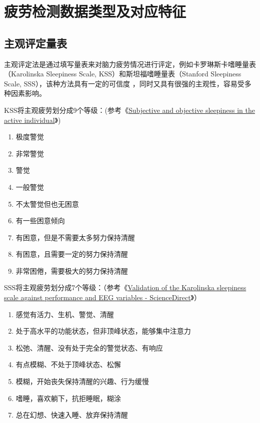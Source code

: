 \section{疲劳检测数据类型及对应特征}

\subsection{主观评定量表}

主观评定法是通过填写量表来对脑力疲劳情况进行评定，例如卡罗琳斯卡嗜睡量表（Karolinska Sleepiness Scale, KSS）和斯坦福嗜睡量表（Stanford Sleepiness Scale, SSS），该种方法具有一定的可信度 ，同时又具有很强的主观性，容易受多种因素影响。

KSS将主观疲劳划分成9个等级：(参考《\href{https://xueshu.baidu.com/usercenter/paper/show?paperid=8dc58cb15e4230afae7bb495ec0b83a1&site=xueshu_se}{Subjective and objective sleepiness in the active individual}》)
\begin{enumerate}
	\item 极度警觉
	\item 非常警觉
	\item 警觉
    \item 一般警觉
    \item 不太警觉但也无困意
    \item 有一些困意倾向
    \item 有困意，但是不需要太多努力保持清醒
    \item 有困意，且需要一定的努力保持清醒
    \item 非常困倦，需要极大的努力保持清醒 \\
\end{enumerate}

SSS将主观疲劳划分成7个等级：（参考《\href{https://xueshu.baidu.com/usercenter/paper/show?paperid=85150b8651495a78e9e8344dd4c0302a&site=xueshu_se&hitarticle=1}{Validation of the Karolinska sleepiness scale against performance and EEG variables - ScienceDirect}》）

\begin{enumerate}
	\item 感觉有活力、生机、警觉、清醒
	\item 处于高水平的功能状态，但非顶峰状态，能够集中注意力
	\item 松弛、清醒、没有处于完全的警觉状态、有响应
    \item 有点模糊、不处于顶峰状态、松懈
    \item 模糊，开始丧失保持清醒的兴趣、行为缓慢
    \item 嗜睡，喜欢躺下，抗拒睡眠，糊涂
    \item 总在幻想、快速入睡、放弃保持清醒
\end{enumerate}


